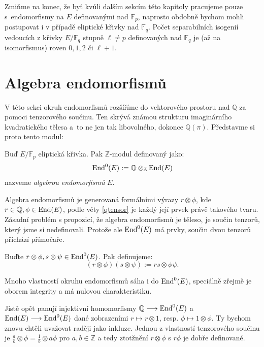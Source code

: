 \documentclass[12pt]{report}
\begin{document}
Zmiňme na konec, že byť kvůli dalším sekcím této kapitoly pracujeme pouze s~endomorfismy na $E$ definovanými nad $\mathbb{F}_p$, naprosto obdobně bychom mohli postupovat i v případě eliptické křivky nad $\mathbb{F}_q$. Počet separabilních isogenií vedoucích z křivky $E/\mathbb{F}_q$ stupně $\ell \neq p$ definovaných nad $\mathbb{F}_q$ je (až na isomorfismus) roven $0,1,2$ či $\ell+1$.

\section{Algebra endomorfismů}

V této sekci okruh endomorfismů rozšíříme do vektorového prostoru nad $\mathbb{Q}$ za pomoci tenzorového součinu. Ten skrývá známou strukturu imaginárního kvadratického tělesa a~to ne jen tak libovolného, dokonce $\mathbb{Q}(\pi)$. Představme si proto tento modul:

\begin{definice}
Buď $E/\mathbb{F}_p$ eliptická křivka. Pak $\mathbb{Z}$-modul definovaný jako:
\begin{equation*}
\operatorname{End}^0 (E) := \mathbb{Q} \otimes_{\mathbb{Z}} \operatorname{End}(E)
\end{equation*}
nazveme \textit{algebrou endomorfismů} $E$.
\end{definice}

Algebra endomorfismů je generovaná formálními výrazy $r \otimes \phi$, kde $r \in \mathbb{Q}, \phi \in \operatorname{End}(E)$, podle věty \ref{qtensor} je každý její prvek právě takového tvaru. Zásadní problém s propozicí, že algebra endomorfismů je těleso, je součin tenzorů, který jsme si nedefinovali. Protože ale $\operatorname{End}^0 (E)$ má  prvky, součin dvou tenzorů přichází přímočaře.
\begin{definice}
Buďte $r \otimes \phi, s \otimes \psi \in \operatorname{End}^0(E)$. Pak definujeme:
\begin{equation*}
(r \otimes \phi) (s \otimes \psi) := rs \otimes \phi \psi.
\end{equation*} 
\end{definice}

Mnoho vlastností okruhu endomorfismů sáha i do $\operatorname{End}^0 (E)$, speciálně zřejmě je oborem integrity a má nulovou charakteristiku.

Jistě opět panují injektivní homomorfismy $\mathbb{Q} \longrightarrow \operatorname{End}^0 (E)$ a $\operatorname{End}(E) \longrightarrow \operatorname{End}^0 (E)$ dané zobrazeními $r \mapsto r \otimes 1$, resp. $\phi \mapsto 1 \otimes \phi$. Ty bychom znovu chtěli uvažovat raději jako inkluze. Jednou z vlastností tenzorového součinu je $\frac{a}{b} \otimes \phi = \frac{1}{b} \otimes a \phi$ pro $a,b \in \mathbb{Z}$ a tedy ztotžnění $r \otimes \phi$ s $r \phi$ je dobře definované. 
\end{document}
